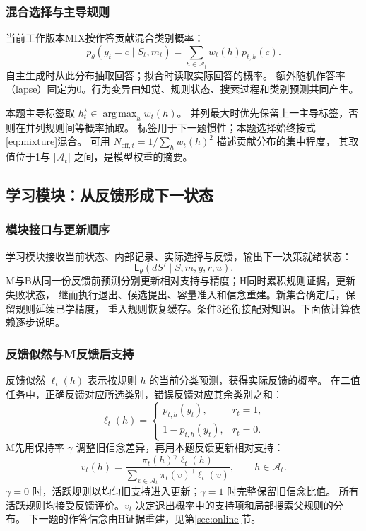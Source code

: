 \documentclass[11pt,a4paper]{article}
\numberwithin{equation}{section}
\newcommand{\A}{\mathcal{A}}
\newcommand{\Ll}{\mathsf{L}}
\DeclareMathOperator*{\argmax}{arg\,max}
\begin{document}
\subsubsection{混合选择与主导规则}
当前工作版本MIX按作答贡献混合类别概率：
\begin{equation}
p_\theta(y_t=c\mid S_t,m_t)=\sum_{h\in\A_t}w_t(h)p_{t,h}(c).
\label{eq:mixture}
\end{equation}
自主生成时从此分布抽取回答；拟合时读取实际回答的概率。
额外随机作答率（lapse）固定为0。行为变异由知觉、规则状态、搜索过程和类别预测共同产生。

本题主导标签取 $h_t^{\star}\in\argmax_h w_t(h)$。
并列最大时优先保留上一主导标签，否则在并列规则间等概率抽取。
标签用于下一题惯性；本题选择始终按式\eqref{eq:mixture}混合。
可用 $N_{\mathrm{eff},t}=1/\sum_h w_t(h)^2$ 描述贡献分布的集中程度，
其取值位于1与 $|\A_t|$ 之间，是模型权重的摘要。

\subsection{学习模块：从反馈形成下一状态}
\label{sec:learning}

\subsubsection{模块接口与更新顺序}
学习模块接收当前状态、内部记录、实际选择与反馈，输出下一决策就绪状态：
\begin{equation}
\Ll_\theta(dS'\mid S,m,y,r,u).
\end{equation}
M与B从同一份反馈前预测分别更新相对支持与精度；H同时累积规则证据，更新失败状态，
继而执行退出、候选提出、容量准入和信念重建。新集合确定后，保留规则延续已学精度，
重入规则恢复缓存。条件3还衔接配对知识。下面依计算依赖逐步说明。

\subsubsection{反馈似然与M反馈后支持}
\label{sec:memory}
反馈似然 $\ell_t(h)$ 表示按规则 $h$ 的当前分类预测，获得实际反馈的概率。
在二值任务中，正确反馈对应所选类别，错误反馈对应其余类别之和：
\begin{equation}
\ell_t(h)=
\begin{cases}
p_{t,h}(y_t),&r_t=1,\\
1-p_{t,h}(y_t),&r_t=0.
\end{cases}
\label{eq:binary-feedback}
\end{equation}
M先用保持率 $\gamma$ 调整旧信念差异，再用本题反馈更新相对支持：
\begin{equation}
v_t(h)=\frac{\pi_t(h)^\gamma\ell_t(h)}
{\sum_{v\in\A_t}\pi_t(v)^\gamma\ell_t(v)},\qquad h\in\A_t.
\label{eq:memory}
\end{equation}
$\gamma=0$ 时，活跃规则以均匀旧支持进入更新；$\gamma=1$ 时完整保留旧信念比值。
所有活跃规则均接受反馈评价。$v_t$ 决定退出概率中的支持项和局部搜索父规则的分布。
下一题的作答信念由H证据重建，见第\ref{sec:online}节。
\end{document}
